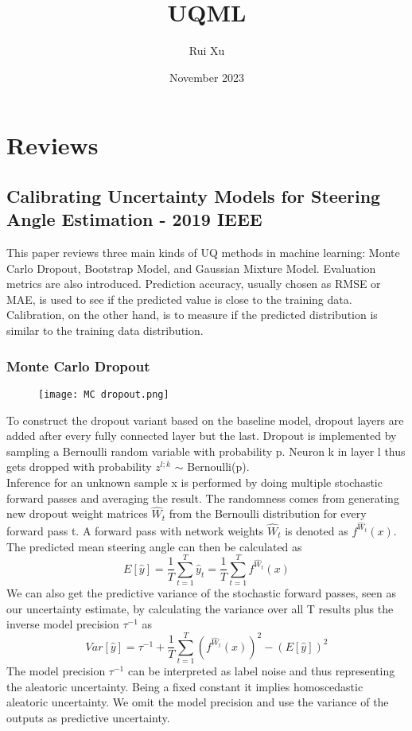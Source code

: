 \documentclass{article}
\title{UQML}
\author{Rui Xu}
\date{November 2023}
\begin{document}
\maketitle

\section{Reviews}
\subsection{Calibrating Uncertainty Models for Steering Angle Estimation - 2019 IEEE}
This paper reviews three main kinds of UQ methods in machine learning: Monte Carlo Dropout, Bootstrap Model, and Gaussian Mixture Model. Evaluation metrics are also introduced. Prediction accuracy, usually chosen as RMSE or MAE, is used to see if the predicted value is close to the training data. Calibration, on the other hand, is to measure if the predicted distribution is similar to the training data distribution.  
\subsubsection{Monte Carlo Dropout}
\begin{figure}[ht]
\texttt{[image: MC dropout.png]}
\end{figure}
\noindent To construct the dropout variant based on the baseline model, dropout layers are added after every fully connected layer but the last. Dropout is implemented by sampling a Bernoulli random variable with probability p. Neuron k in layer l thus gets dropped with probability $z^{l;k}$  $\sim$ Bernoulli(p).\\

\noindent Inference for an unknown sample x is performed by doing multiple stochastic forward passes and averaging the result. The randomness comes from generating new dropout weight matrices $\hat{W}_t$ from the Bernoulli distribution for every forward pass t. A forward pass with network weights $\hat{W}_t$ is denoted as $f ^{\hat{W}_t}(x)$. The predicted mean steering angle can then be calculated as
\[ E[\hat{y}]=\frac{1}{T}\sum_{t=1}^{T}\hat{y}_t=\frac{1}{T}\sum_{t=1}^{T}f ^{\hat{W}_t}(x) \]
We can also get the predictive variance of the stochastic forward passes, seen as our uncertainty estimate, by calculating the variance over all T results plus the inverse model
precision $\tau^{-1}$ as
\[Var[\hat{y}]=\tau^{-1}+\frac{1}{T}\sum_{t=1}^{T}(f ^{\hat{W}_t}(x))^2-(E[\hat{y}])^2\]
The model precision $\tau^{-1}$ can be interpreted as label noise and thus representing the aleatoric uncertainty. Being a fixed constant it implies homoscedastic aleatoric uncertainty. We omit the model precision and use the variance of the outputs as predictive uncertainty.
\end{document}

